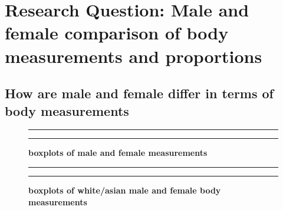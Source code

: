 \documentclass[]{article}
\begin{document}
\section{Research Question: Male and female comparison of body measurements and proportions }
\label{sec:rq}

\subsection{How are male and female differ in terms of body measurements}
\label{sec:rq2}

\begin{figure}[!ht]
    \hrule
    \caption{ \textbf{boxplots of male and female measurements} }
    \begin{center}
    \end{center}
    \label{fig:measure.mf}
    \hrule
\end{figure}

\begin{figure}[!ht]
    \hrule
    \caption{ \textbf{boxplots of white/asian male and female body measurements} }
    \begin{center}
    \end{center}
    \label{fig:measure.amfwmf}
    \hrule
\end{figure}
\end{document}
